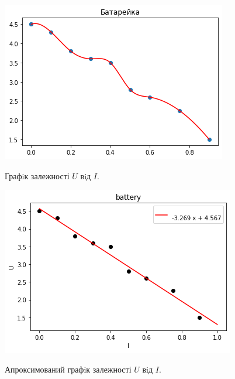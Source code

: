 \documentclass[a4paper,12pt]{article}
\begin{document}
	\begin{figure}[h!]
		\begin{minipage}[h]{0.5\linewidth}
			\includegraphics[width=1\linewidth]{Prt sc/Figure_1_1.jpeg}
			\label{Figure_1_1}
			\caption{Графiк залежності $U$ вiд $I$.}
		\end{minipage}
		\begin{minipage}[h]{0.5\linewidth}
			\includegraphics[width=1\linewidth]{Prt sc/Figure_1_2.jpeg}
			\label{Figure_1_2}
			\caption{Апроксимований графiк залежності $U$ вiд $I$.}
		\end{minipage}
	\end{figure}
	
\end{document}
